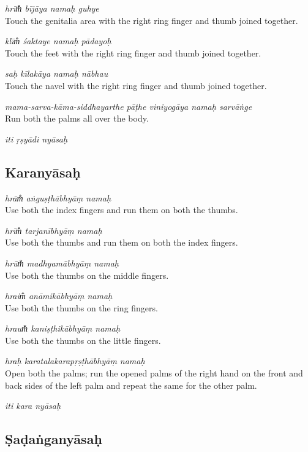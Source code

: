 \documentclass[12pt,oneside,a4paper]{article}
\newenvironment{shloka}[1]
  {\bigskip\center#1\varwidth{\linewidth}}
  {\endvarwidth\endcenter\bigskip}
\newcommand{\tl}[1]{\emph{#1}}
\begin{document}
\tl{hrīm̐ bījāya namaḥ guhye}\\
Touch the genitalia area with the right ring finger and thumb joined together.

\tl{klīm̐ śaktaye namaḥ pādayoḥ}\\
Touch the feet with the right ring finger and thumb joined together.

\tl{saḥ kīlakāya namaḥ nābhau}\\
Touch the navel with the right ring finger and thumb joined together.

\tl{mama-sarva-kāma-siddhayarthe pāṭhe viniyogāya namaḥ sarvāṅge}\\
Run both the palms all over the body.

\begin{shloka}\itshape
  iti ṛṣyādi nyāsaḥ
\end{shloka}

\subsection{Karanyāsaḥ}

\tl{hrām̐ aṅguṣṭhābhyāṃ namaḥ}\\
Use both the index fingers and run them on both the thumbs.

\tl{hrīm̐ tarjanībhyāṃ namaḥ}\\
Use both the thumbs and run them on both the index fingers.

\tl{hrūm̐ madhyamābhyāṃ namaḥ}\\
Use both the thumbs on the middle fingers.

\tl{hraim̐ anāmikābhyāṃ namaḥ}\\
Use both the thumbs on the ring fingers.

\tl{hraum̐ kaniṣṭhikābhyāṃ namaḥ}\\
Use both the thumbs on the little fingers.

\tl{hraḥ karatalakarapṛṣṭhābhyāṃ namaḥ}\\
Open both the palms; run the opened palms of the right hand on the front and
back sides of the left palm and repeat the same for the other palm.

\begin{shloka}\itshape
  iti kara nyāsaḥ
\end{shloka}

\subsection{Ṣaḍaṅganyāsaḥ}
\end{document}
